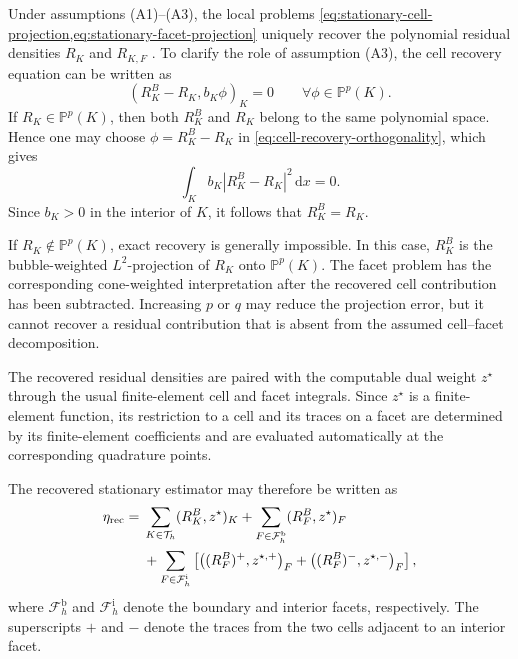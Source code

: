Under assumptions (A1)--(A3), the local problems \cref{eq:stationary-cell-projection,eq:stationary-facet-projection} uniquely recover the polynomial residual densities \(R_K\) and \(R_{K,F}\) \cite{Rognes_Logg_2013}.
To clarify the role of assumption (A3), the cell recovery equation can be written as
\begin{equation}
  (R_K^B-R_K,b_K\phi)_K=0
  \qquad
  \forall\phi\in\mathbb P^p(K).
  \label{eq:cell-recovery-orthogonality}
\end{equation}
If \(R_K\in\mathbb P^p(K)\), then both \(R_K^B\) and \(R_K\) belong to the same polynomial space. Hence one may choose
\(\phi=R_K^B-R_K\) in \cref{eq:cell-recovery-orthogonality}, which gives
\[
  \int_K b_K|R_K^B-R_K|^2\,\mathrm dx=0.
\]
Since \(b_K>0\) in the interior of \(K\), it follows that \(R_K^B=R_K\).

If \(R_K\notin\mathbb P^p(K)\), exact recovery is generally impossible. In this case, \(R_K^B\) is the bubble-weighted \(L^2\)-projection of \(R_K\) onto \(\mathbb P^p(K)\). The facet problem has the corresponding cone-weighted interpretation after the recovered cell contribution has been subtracted. Increasing \(p\) or \(q\) may reduce the projection error, but it cannot recover a residual contribution that is absent from the assumed cell--facet decomposition.

The recovered residual densities are paired with the computable dual weight \(z^\star\) through the usual finite-element cell and facet integrals. Since \(z^\star\) is a finite-element function, its restriction to a cell and its traces on a facet are determined by its finite-element coefficients and are evaluated automatically at the corresponding quadrature points.

The recovered stationary estimator may therefore be written as
\begin{align}
  \eta_{\mathrm{rec}}
  ={}&
  \sum_{K\in\mathcal T_h}(R_K^B,z^\star)_K
  +
  \sum_{F\in\mathcal F_h^{\mathrm b}}
  (R_F^B,z^\star)_F
  \notag\\
  &+
  \sum_{F\in\mathcal F_h^{\mathrm i}}
  \left[
    \bigl((R_F^B)^+,z^{\star,+}\bigr)_F
    +
    \bigl((R_F^B)^-,z^{\star,-}\bigr)_F
  \right],
  \label{eq:stationary-recovered-estimator}
\end{align}
where \(\mathcal F_h^{\mathrm b}\) and \(\mathcal F_h^{\mathrm i}\) denote the boundary and interior facets, respectively. The superscripts \(+\) and \(-\) denote the traces from the two cells adjacent to an interior facet.

